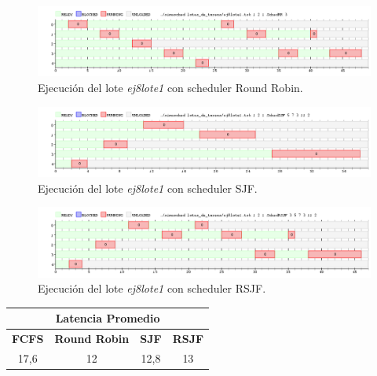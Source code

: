 \begin{figure}[!h]
	\begin{center}
		\includegraphics[width=500px]{imagenes/ej8_prueba1_rr.png}
		\caption{Ejecución del lote \emph{ej8lote1} con scheduler Round Robin.}
		\label{fig:grafico_ej8_prueba1_rr}
	\end{center}
\end{figure}

\begin{figure}[!h]
	\begin{center}
		\includegraphics[width=500px]{imagenes/ej8_prueba1_sjf.png}
		\caption{Ejecución del lote \emph{ej8lote1} con scheduler SJF.}
		\label{fig:grafico_ej8_prueba1_sjf}
	\end{center}
\end{figure}

\begin{figure}[!h]
	\begin{center}
		\includegraphics[width=500px]{imagenes/ej8_prueba1_rsjf.png}
		\caption{Ejecución del lote \emph{ej8lote1} con scheduler RSJF.}
		\label{fig:grafico_ej8_prueba1_rsjf}
	\end{center}
\end{figure}

\newpage

\begin{center}
	\begin{tabular}{|c|c|c|c|}
		\hline
		\multicolumn{4}{|c|}{\large{\textbf{Latencia Promedio}}} \\
		\hline
		\textbf{FCFS} & \textbf{Round Robin} & \textbf{SJF} & \textbf{RSJF} \\
		\hline
		17,6 & 12 & 12,8 & 13 \\
		\hline
	\end{tabular}
\end{center}

